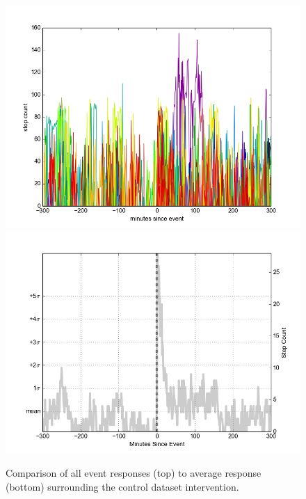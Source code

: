 \begin{figure}
\centering
\includegraphics[width=0.9\columnwidth]{./img/perfect_intervention_individual_events.png}
\includegraphics[width=0.9\columnwidth]{./img/perfect_intervention.png}
\caption{Comparison of all event responses (top) to average response (bottom) surrounding the control dataset intervention.}
\label{fig:interventionAverage}
\end{figure}


